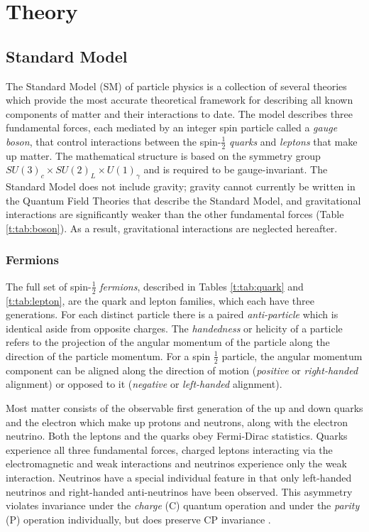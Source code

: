 \chapter{Theory}\label{c:Theory}

\section{Standard Model}


The Standard Model (SM) of particle physics is a collection of several theories which provide the most accurate theoretical framework for describing all known components of matter and their interactions to date. The model describes three fundamental forces, each mediated by an integer spin particle called a \textit{gauge boson}, that control interactions between the spin-$\frac{1}{2}$ \textit{quarks} and \textit{leptons} that make up matter. The mathematical structure is  based on the symmetry group $SU(3)_c\times SU(2)_L\times U(1)_\gamma$ and is required to be gauge-invariant. The Standard Model does not include gravity; gravity cannot currently be written in the Quantum Field Theories that describe the Standard Model, and gravitational interactions are significantly weaker than the other fundamental forces (Table \ref{t:tab:boson}). As a result, gravitational interactions are neglected hereafter.

	\subsection{Fermions}

		The full set of spin-$\frac{1}{2}$ \textit{fermions}, described in Tables \ref{t:tab:quark} and \ref{t:tab:lepton}, are the quark and lepton families, which each have three generations. For each distinct particle there is a paired \textit{anti-particle} which is identical aside from opposite charges. The \textit{handedness} or helicity of a particle refers to the projection of the angular momentum of the particle along the direction of the particle momentum. For a spin $\frac{1}{2}$ particle, the angular momentum component can be aligned along the direction of motion (\textit{positive} or \textit{right-handed} alignment) or opposed to it (\textit{negative} or \textit{left-handed} alignment).

		Most matter consists of the observable first generation of the up and down quarks and the electron which make up protons and neutrons, along with the electron neutrino. Both the leptons and the quarks obey Fermi-Dirac statistics. Quarks experience all three fundamental forces, charged leptons interacting via the electromagnetic and weak interactions and neutrinos experience only the weak interaction. Neutrinos have a special individual feature in that only left-handed neutrinos and right-handed anti-neutrinos have been observed. This asymmetry violates invariance under the \textit{charge} (C) quantum operation and under the \textit{parity} (P) operation individually, but does preserve CP invariance \cite{martinshaw}.

